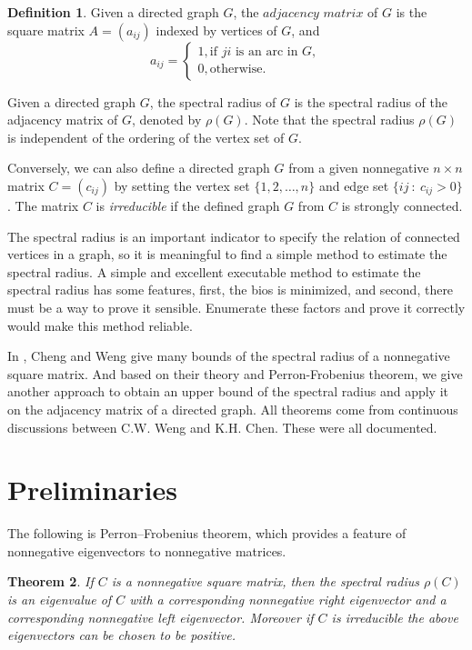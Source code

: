 \documentclass[12pt, a4paper]{article}
\theoremstyle{plain}
\newtheorem{thm}{Theorem}[section]
\theoremstyle{definition}
\newtheorem{defn}[thm]{Definition}
\begin{document}
\begin{defn}
    Given a directed graph $G$, the $\textit{adjacency matrix}$ of $G$ is the square
    matrix $A = (a_{ij})$ indexed by vertices of $G$, and
     \[a_{ij} =\begin{cases}
        1, \text{if $ji$ is an arc in $G$}, \\
        0, \text{otherwise.}
            \end{cases}
     \]
\end{defn}

Given a directed graph $G$, the spectral radius of $G$ is the
 spectral radius of the adjacency matrix of $G$, denoted by
 $\rho(G)$. Note that the spectral radius $\rho(G)$ is
 independent of the ordering of the vertex set of $G$. 



Conversely, we can also define a directed graph $G$ from a given
 nonnegative $n\times n$ matrix $C=(c_{ij})$  by setting the vertex
 set $\{1, 2, \ldots, n\}$ and edge set $\{ij~\colon~c_{ij}>0\}$.
 The matrix $C$ is {\it irreducible} if the defined graph $G$ from
 $C$ is strongly connected.  


The spectral radius is an important indicator to specify the relation
 of connected vertices in a graph, so it is meaningful to find a simple
 method to estimate the spectral radius. A simple and excellent
 executable method to estimate the spectral radius has some features,
 first, the bios is minimized, and second, there must be a way to prove
 it sensible. Enumerate these factors and prove it correctly would make this method reliable.

In \cite{chang}, Cheng and Weng give many bounds of the spectral radius of a nonnegative square matrix. And based on their theory and Perron-Frobenius theorem, we give another approach to obtain an upper bound of the spectral radius and apply it on the adjacency matrix of a directed graph.
All theorems come from continuous discussions between C.W. Weng and K.H. Chen. These were all documented.\cite{src_files}

\section{Preliminaries}

The following is Perron–Frobenius theorem, which provides a feature of
 nonnegative eigenvectors to nonnegative matrices.

\begin{thm} \cite{prn_fros2} \label{thm:Perron_Frobenius}
    If $C$ is a nonnegative square matrix, then the spectral radius $\rho(C)$ is an
    eigenvalue of $C$ with a corresponding nonnegative right eigenvector and a
    corresponding nonnegative left eigenvector.
    Moreover if $C$ is irreducible the above eigenvectors can be chosen to be positive. 
\end{thm}
\end{document}

